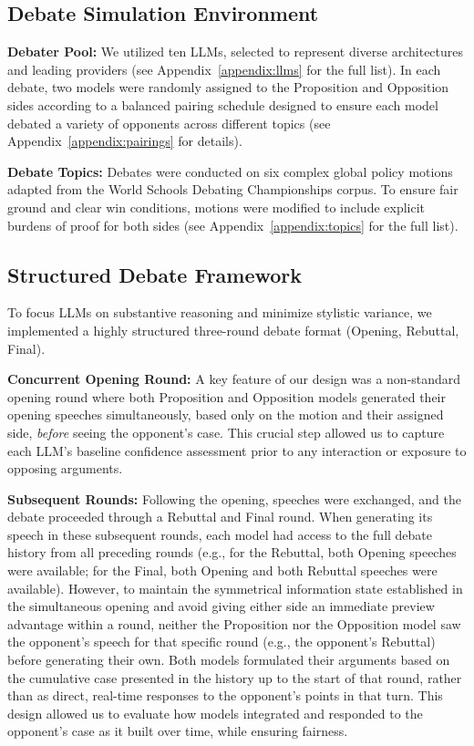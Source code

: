 \documentclass{article}
\begin{document}
\subsection{Debate Simulation Environment}
\label{subsec:debate_env}

\textbf{Debater Pool:} We utilized ten LLMs, selected to represent diverse architectures and leading providers (see Appendix~\ref{appendix:llms} for the full list). In each debate, two models were randomly assigned to the Proposition and Opposition sides according to a balanced pairing schedule designed to ensure each model debated a variety of opponents across different topics (see Appendix~\ref{appendix:pairings} for details).

\textbf{Debate Topics:} Debates were conducted on six complex global policy motions adapted from the World Schools Debating Championships corpus. To ensure fair ground and clear win conditions, motions were modified to include explicit burdens of proof for both sides (see Appendix~\ref{appendix:topics} for the full list).

\subsection{Structured Debate Framework}
\label{subsec:debate_framework}

To focus LLMs on substantive reasoning and minimize stylistic variance, we implemented a highly structured three-round debate format (Opening, Rebuttal, Final).

\textbf{Concurrent Opening Round:} A key feature of our design was a non-standard opening round where both Proposition and Opposition models generated their opening speeches simultaneously, based only on the motion and their assigned side, \textit{before} seeing the opponent's case. This crucial step allowed us to capture each LLM's baseline confidence assessment prior to any interaction or exposure to opposing arguments.

\textbf{Subsequent Rounds:} Following the opening, speeches were exchanged, and the debate proceeded through a Rebuttal and Final round. When generating its speech in these subsequent rounds, each model had access to the full debate history from all preceding rounds (e.g., for the Rebuttal, both Opening speeches were available; for the Final, both Opening and both Rebuttal speeches were available). However, to maintain the symmetrical information state established in the simultaneous opening and avoid giving either side an immediate preview advantage within a round, neither the Proposition nor the Opposition model saw the opponent's speech for that specific round (e.g., the opponent's Rebuttal) before generating their own. Both models formulated their arguments based on the cumulative case presented in the history up to the start of that round, rather than as direct, real-time responses to the opponent's points in that turn. This design allowed us to evaluate how models integrated and responded to the opponent's case as it built over time, while ensuring fairness.
\end{document}
